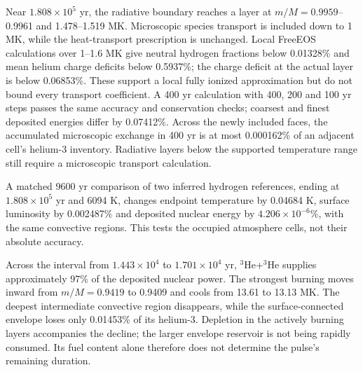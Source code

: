 \documentclass[11pt,letterpaper]{article}
\begin{document}
Near $1.808\times10^5$ yr, the radiative boundary reaches a layer at
$m/M=0.9959$--0.9961 and 1.478--1.519 MK. Microscopic species transport
is included down to 1 MK, while the heat-transport prescription is unchanged.
Local FreeEOS calculations over 1--1.6 MK give neutral hydrogen fractions
below 0.01328\% and mean helium charge deficits below 0.5937\%; the charge
deficit at the actual layer is below 0.06853\%. These support a local
fully ionized approximation but do not bound every transport coefficient.
A 400 yr calculation with 400, 200 and 100 yr steps passes the same
accuracy and conservation checks; coarsest and finest deposited energies
differ by 0.07412\%. Across the newly included faces, the accumulated
microscopic exchange in 400 yr is at most 0.000162\% of an adjacent
cell's helium-3 inventory. Radiative layers below the supported temperature
range still require a microscopic transport calculation.

A matched 9600 yr comparison of two inferred hydrogen references, ending
at $1.808\times10^5$ yr and 6094 K, changes endpoint temperature by
0.04684 K, surface luminosity by 0.002487\% and deposited nuclear energy
by $4.206\times10^{-6}\%$, with the same convective regions.
This tests the occupied atmosphere cells, not their absolute accuracy.

Across the interval from $1.443\times10^4$ to $1.701\times10^4$ yr,
$^3$He+$^3$He supplies approximately 97\% of the deposited nuclear power.
The strongest burning moves inward from $m/M=0.9419$ to 0.9409 and cools
from 13.61 to 13.13 MK. The deepest intermediate convective region disappears,
while the surface-connected envelope loses only 0.01453\% of its helium-3.
Depletion in the actively burning layers accompanies the decline; the larger
envelope reservoir is not being rapidly consumed. Its fuel content alone
therefore does not determine the pulse's remaining duration.
\end{document}
